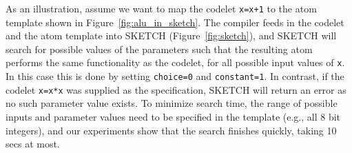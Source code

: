 As an illustration, assume we want to map the codelet {\tt x=x+1} to the atom
template shown in Figure~\ref{fig:alu_in_sketch}. The \pktlanguage compiler
feeds in the codelet and the atom template into SKETCH
(Figure~\ref{fig:sketch}), and SKETCH will search for possible values of the
parameters such that the resulting atom performs the same functionality as the
codelet, for all possible input values of {\tt x}.  In this case this is done
by setting {\tt choice=0} and {\tt constant=1}.  In contrast, if the codelet
{\tt x=x*x} was supplied as the specification, SKETCH will return an error as
no such parameter value exists. To minimize search time, the range of possible
inputs and parameter values need to be specified in the template (e.g., all 8
bit integers), and our experiments show that the search finishes quickly,
taking 10 secs at most.


